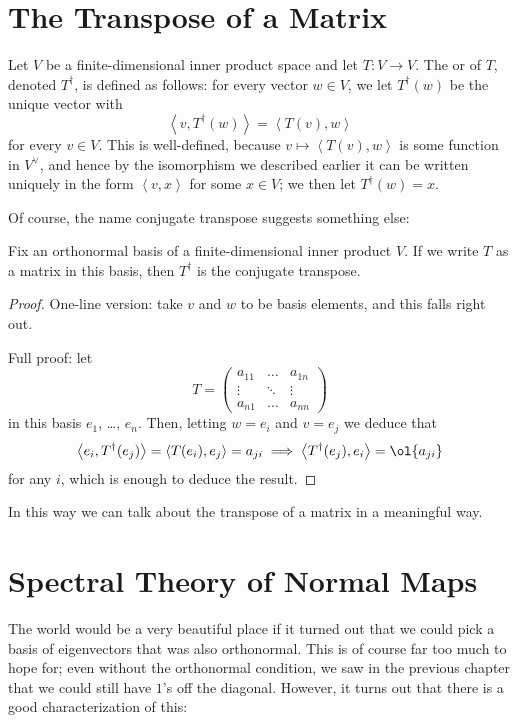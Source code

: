 \section{The Transpose of a Matrix}
Let $V$ be a finite-dimensional inner product space and let $T : V \to V$.
The  or  of $T$, denoted $T^\dagger$,
is defined as follows: for every vector $w \in V$, we let $T^\dagger(w)$ be the unique vector with
\[ \left< v, T^\dagger(w) \right> = \left< T(v), w \right> \]
for every $v \in V$.
This is well-defined, because $v \mapsto \left< T(v), w \right>$ is some function in $V^\vee$,
and hence by the isomorphism we described earlier it can be written uniquely in the form $\left< v, x \right>$
for some $x \in V$; we then let $T^\dagger(w) = x$.

Of course, the name conjugate transpose suggests something else:
\begin{theorem}
	Fix an orthonormal basis of a finite-dimensional inner product $V$.
	If we write $T$ as a matrix in this basis, then $T^\dagger$ is the conjugate transpose.
\end{theorem}
\begin{proof}
	One-line version: take $v$ and $w$ to be basis elements, and this falls right out.

	Full proof: let
	\[ T = \left(
		\begin{array}{ccc}
			a_{11} & \dots & a_{1n} \\
			\vdots & \ddots & \vdots \\
			a_{n1} & \dots & a_{nn}
		\end{array}
		\right)
	\]
	in this basis $e_1$, \dots, $e_n$.
	Then, letting $w = e_i$ and $v = e_j$ we deduce that
	\[ \left< e_i, T^\dagger(e_j) \right> = \left< T(e_i) , e_j\right> = a_{ji}
		\implies
		\left< T^\dagger(e_j), e_i \right> = \ol{a_{ji}} \]
	for any $i$, which is enough to deduce the result.
\end{proof}

In this way we can talk about the transpose of a matrix in a meaningful way.

\section{Spectral Theory of Normal Maps}
The world would be a very beautiful place if it turned out
that we could pick a basis of eigenvectors that was also orthonormal.
This is of course far too much to hope for; even without the orthonormal condition,
we saw in the previous chapter that we could still have $1$'s off the diagonal.
However, it turns out that there is a good characterization of this:

